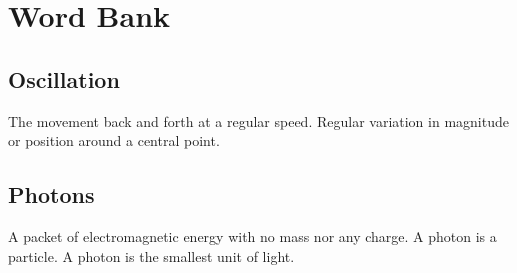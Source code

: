 \documentclass{article}
\begin{document}
\section{Word Bank}
\subsection{Oscillation}\label{sec:oscillation}
The movement back and forth at a regular speed. Regular variation in magnitude or position around a central point.

\subsection{Photons}\label{sec:photons}
A packet of electromagnetic energy with no mass nor any charge. A photon is a particle. A photon is the smallest unit of light.
\end{document}
